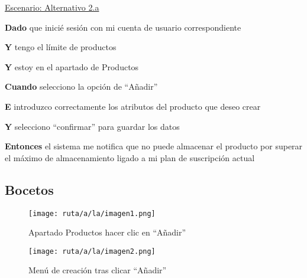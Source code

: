 \documentclass[a4paper,12pt]{article}
\begin{document}
\underline{Escenario: Alternativo 2.a}\par
\vspace{0.15cm}
\textbf{Dado} que inicié sesión con mi cuenta de usuario correspondiente\par
\textbf{Y} tengo el límite de productos\par
\textbf{Y} estoy en el apartado de Productos\par
\textbf{Cuando} selecciono la opción de \enquote{Añadir}\par
\textbf{E} introduzco correctamente los atributos del producto que deseo crear\par
\textbf{Y} selecciono \enquote{confirmar} para guardar los datos\par
\textbf{Entonces} el sistema me notifica que no puede almacenar el producto por superar el máximo de almacenamiento ligado a mi plan de suscripción actual\par
\vspace{0.20cm}


\subsection{Bocetos}
\begin{figure}[H]
    \centering
    \texttt{[image: ruta/a/la/imagen1.png]}
    \caption{Apartado Productos hacer clic en \enquote{Añadir}}
    \label{fig:anadirProducto}
\end{figure}

\begin{figure}[H]
    \centering
    \texttt{[image: ruta/a/la/imagen2.png]}
    \caption{Menú de creación tras clicar \enquote{Añadir}}
    \label{fig:menuCreacion}
\end{figure}

\newpage
\end{document}
